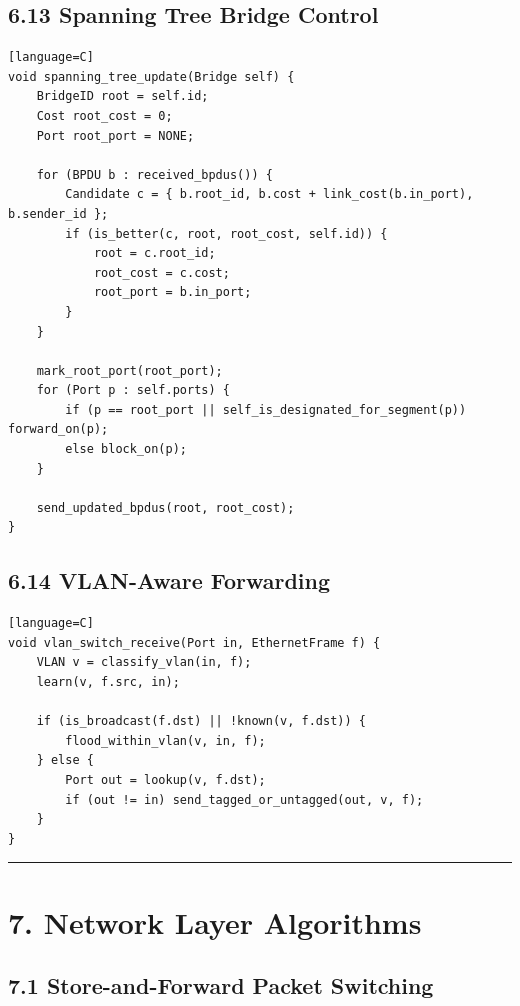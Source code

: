 \documentclass[11pt]{article}
\begin{document}
\subsection{6.13 Spanning Tree Bridge
Control}\label{spanning-tree-bridge-control}

\begin{verbatim}[language=C]
void spanning_tree_update(Bridge self) {
    BridgeID root = self.id;
    Cost root_cost = 0;
    Port root_port = NONE;

    for (BPDU b : received_bpdus()) {
        Candidate c = { b.root_id, b.cost + link_cost(b.in_port), b.sender_id };
        if (is_better(c, root, root_cost, self.id)) {
            root = c.root_id;
            root_cost = c.cost;
            root_port = b.in_port;
        }
    }

    mark_root_port(root_port);
    for (Port p : self.ports) {
        if (p == root_port || self_is_designated_for_segment(p)) forward_on(p);
        else block_on(p);
    }

    send_updated_bpdus(root, root_cost);
}
\end{verbatim}

\subsection{6.14 VLAN-Aware Forwarding}\label{vlan-aware-forwarding}

\begin{verbatim}[language=C]
void vlan_switch_receive(Port in, EthernetFrame f) {
    VLAN v = classify_vlan(in, f);
    learn(v, f.src, in);

    if (is_broadcast(f.dst) || !known(v, f.dst)) {
        flood_within_vlan(v, in, f);
    } else {
        Port out = lookup(v, f.dst);
        if (out != in) send_tagged_or_untagged(out, v, f);
    }
}
\end{verbatim}

\begin{center}\rule{0.5\linewidth}{0.5pt}\end{center}

\section{7. Network Layer Algorithms}\label{network-layer-algorithms}

\subsection{7.1 Store-and-Forward Packet
Switching}\label{store-and-forward-packet-switching}
\end{document}
